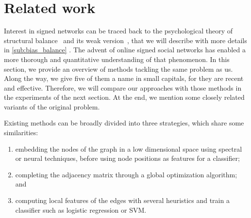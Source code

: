 \section{Related work}
\label{sec:troll_related}

\begin{newcontent}
Interest in signed networks can be traced back to the psychological theory of structural
balance~\autocites{Cartwright56}{HeiderBook58} and its weak version~\autocite{davis1967clustering},
that we will describe with more details in \autoref{sub:bias_balance} .
The advent of online signed social networks has enabled a
more thorough and quantitative understanding of that phenomenon. In this section, we provide an
overview of methods tackling the same \esp{} problem as us. Along the way, we give five of them a
name in small capitals, for they are recent and effective. Therefore, we will compare our approaches
with those methods in the experiments of the next section. At the end, we mention some closely
related variants of the original \esp{} problem.

\bigskip

Existing methods can be broadly divided into three strategies, which share some similarities:
\begin{enumerate}[1),nosep]
	\item embedding the nodes of the graph in a low dimensional space using spectral or neural
		techniques, before using node positions as features for a classifier;
	\item completing the adjacency matrix through a global optimization algorithm; and
	\item computing local features of the edges with several heuristics and train a classifier such as
		logistic regression or SVM.
\end{enumerate}


\end{newcontent}
